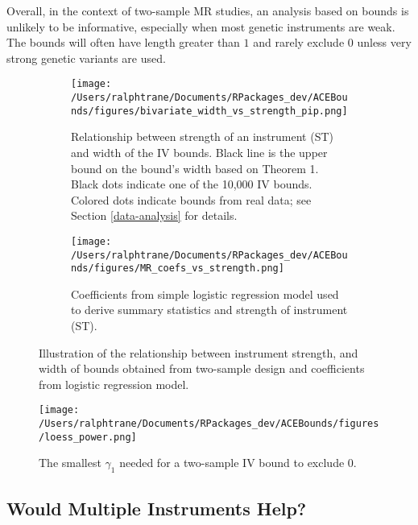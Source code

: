 \documentclass[
]{article}
\theoremstyle{plain}
\begin{document}
Overall, in the context of two-sample MR studies, an analysis based on bounds is unlikely to be informative, especially when most genetic instruments are weak. The bounds will often have length greater than \(1\) and rarely exclude \(0\) unless very strong genetic variants are used.

\begin{figure*}
  \centering
  \begin{subfigure}[t]{0.48\textwidth}
    \texttt{[image: /Users/ralphtrane/Documents/RPackages\_dev/ACEBounds/figures/bivariate\_width\_vs\_strength\_pip.png]}
    \caption{Relationship between strength of an instrument (ST) and width of the IV bounds. Black line is the upper bound on the bound's width based on Theorem 1. Black dots indicate one of the 10,000 IV bounds. Colored dots indicate bounds from real data; see Section \ref{data-analysis} for details.}
    \label{fig:biv_width_vs_strength}
  \end{subfigure}%
  \hspace{0.15in}
  \begin{subfigure}[t]{0.48\textwidth}
    \centering
    \texttt{[image: /Users/ralphtrane/Documents/RPackages\_dev/ACEBounds/figures/MR\_coefs\_vs\_strength.png]}
    \caption{Coefficients from simple logistic regression model used to derive summary statistics and strength of instrument (ST).}
    \label{fig:coef_vs_strength}
  \end{subfigure}
  \caption{Illustration of the relationship between instrument strength, and width of bounds obtained from two-sample design and coefficients from logistic regression model.}
  \label{fig:biv_bounds_vs_strength}
\end{figure*}

\begin{figure}[H]
  \centering
  \texttt{[image: /Users/ralphtrane/Documents/RPackages\_dev/ACEBounds/figures/loess\_power.png]}
  \caption{The smallest $\gamma_1$ needed for a two-sample IV bound to exclude $0$.}
  \label{fig:power_curves}
\end{figure}

\hypertarget{would-multiple-instruments-help}{%
\subsection{Would Multiple Instruments Help?}\label{would-multiple-instruments-help}}
\end{document}
